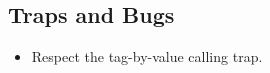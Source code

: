 \documentclass[12pt]{article}
\begin{document}
\subsection{Traps and Bugs}
\begin{itemize}
\item Respect the tag-by-value calling trap.
\end{itemize}

%
% 
\end{document}
